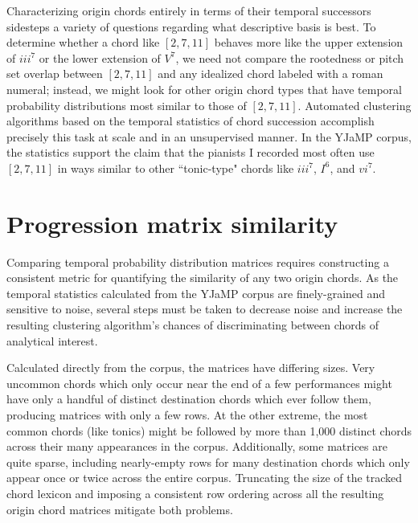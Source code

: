 Characterizing origin chords entirely in terms of their temporal successors sidesteps a variety of questions regarding what descriptive basis is best.  To determine whether a chord like $[2,7,11]$ behaves more like the upper extension of $iii^7$ or the lower extension of $V^7$, we need not compare the rootedness or pitch set overlap between $[2,7,11]$ and any idealized chord labeled with a roman numeral; instead, we might look for other origin chord types that have temporal probability distributions most similar to those of $[2,7,11]$.  Automated clustering algorithms based on the temporal statistics of chord succession accomplish precisely this task at scale and in an unsupervised manner.  In the YJaMP corpus, the statistics support the claim that the pianists I recorded most often use $[2,7,11]$ in ways similar to other ``tonic-type" chords like $iii^7$, $I^6$, and $vi^7$.

\section{Progression matrix similarity}
Comparing temporal probability distribution matrices requires constructing a consistent metric for quantifying the similarity of any two origin chords.  As the temporal statistics calculated from the YJaMP corpus are finely-grained and sensitive to noise, several steps must be taken to decrease noise and increase the resulting clustering algorithm's chances of discriminating between chords of analytical interest.

Calculated directly from the corpus, the matrices have differing sizes.  Very uncommon chords which only occur near the end of a few performances might have only a handful of distinct destination chords which ever follow them, producing matrices with only a few rows.  At the other extreme, the most common chords (like tonics) might be followed by more than 1,000 distinct chords across their many appearances in the corpus.  Additionally, some matrices are quite sparse, including nearly-empty rows for many destination chords which only appear once or twice across the entire corpus.  Truncating the size of the tracked chord lexicon and imposing a consistent row ordering across all the resulting origin chord matrices mitigate both problems.

